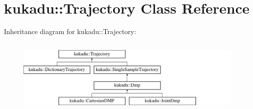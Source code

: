 \hypertarget{classkukadu_1_1Trajectory}{\section{kukadu\-:\-:Trajectory Class Reference}
\label{classkukadu_1_1Trajectory}
}
Inheritance diagram for kukadu\-:\-:Trajectory\-:\begin{figure}[H]
\begin{center}
\leavevmode
\includegraphics[height=3.733333cm]{classkukadu_1_1Trajectory}
\end{center}
\end{figure}
